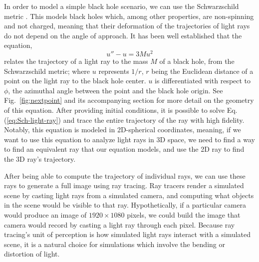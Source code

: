 In order to model a simple black hole scenario, we can use the Schwarzschild metric \cite{schw_soln-2007}.
This models black holes which, among other properties, are non-spinning and not charged,
meaning that their deformation of the trajectories of light rays do not depend on the angle of approach.
It has been well established \cite{gravitation-mtw} that the equation,
\begin{equation}
	u'' - u = 3 M u^2
	\label{eq:Sch-light-ray}
\end{equation}
relates the trajectory of a light ray to the mass $M$ of a black hole, from the Schwarzschild metric;
where $u$ represents $1/r$, $r$ being the Euclidean distance of a point on the light ray to the black hole center.
$u$ is differentiated with respect to $\phi$, the azimuthal angle between the point and the black hole origin.
See Fig.~\ref{fig:nextpoint} and its accompanying section for more detail on the geometry of this equation.
After providing initial conditions,  it is possible to solve Eq.(\ref{eq:Sch-light-ray}) and trace the entire trajectory of the ray with high fidelity.
Notably, this equation is modeled in 2D-spherical coordinates, meaning, if we want to use this equation to analyze light rays in 3D space, we need to find a way to find an equivalent ray that our equation models, and use the 2D ray to find the 3D ray's trajectory.

After being able to compute the trajectory of individual rays, we can use these rays to generate a full image using ray tracing. Ray tracers render a simulated scene by casting light rays from a simulated camera, and computing what objects in the scene would be visible to that ray. Hypothetically, if a particular camera would produce an image of $1920 \times 1080$ pixels, we could build the image that camera would record by casting a light ray through each pixel. Because ray tracing's unit of perception is how simulated light rays interact with a simulated scene, it is a natural choice for simulations which involve the bending or distortion of light.




